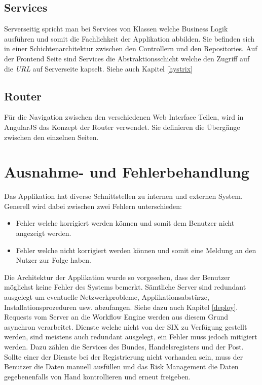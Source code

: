 \subsection{Services}

Serverseitig spricht man bei Services von Klassen welche Business Logik ausführen und somit die Fachlichkeit der Applikation abbilden. Sie befinden sich in einer Schichtenarchitektur zwischen den Controllern und den Repositories. Auf der Frontend Seite sind Services die Abstraktionsschicht welche den Zugriff auf die \textit{\gls{URL}} auf Serverseite kapselt. Siehe auch Kapitel \ref{hystrix}

\subsection{Router}

Für die Navigation zwischen den verschiedenen Web Interface Teilen, wird in AngularJS das Konzept der Router verwendet. Sie definieren die Übergänge zwischen den einzelnen Seiten.

\section{Ausnahme- und Fehlerbehandlung}

Das Applikation hat diverse Schnittstellen zu internen und externen System. Generell wird dabei zwischen zwei Fehlern unterschieden:
\begin{itemize}
	\item Fehler welche korrigiert werden können und somit dem Benutzer nicht angezeigt werden.
	\item Fehler welche nicht korrigiert werden können und somit eine Meldung an den Nutzer zur Folge haben.
\end{itemize}
Die Architektur der Applikation wurde so vorgesehen, dass der Benutzer möglichst keine Fehler des Systems bemerkt. Sämtliche Server sind redundant ausgelegt um eventuelle Netzwerkprobleme, Applikationsabstürze, Installationsprozeduren usw. abzufangen. Siehe dazu auch Kapitel \ref{deploy}. Requests vom Server an die Workflow Engine werden aus diesem Grund asynchron verarbeitet.\newline
Dienste welche nicht von der SIX zu Verfügung gestellt werden, sind meistens auch redundant ausgelegt, ein Fehler muss jedoch mitigiert werden. Dazu zählen die Services des Bundes, Handelsregisters und der Post. Sollte einer der Dienste bei der Registrierung nicht vorhanden sein, muss der Benutzer die Daten manuell ausfüllen und das Risk Management die Daten gegebenenfalls von Hand kontrollieren und erneut freigeben.

